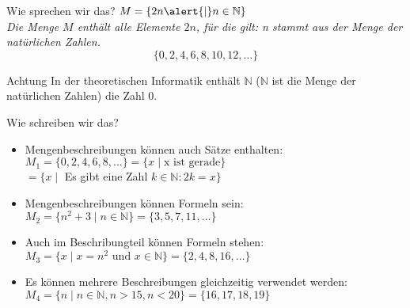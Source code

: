 %
%
%
%

\begin{frame}[fragile]{Wie sprechen wir das?}
$M = \{2n \alert{\mid} n \in \mathbb{N}\}$ \\

\emph{Die Menge $M$ enthält alle Elemente $2n$, \alert{für die gilt}: n stammt aus der Menge der natürlichen Zahlen.}
\vspace{5pt}
$$
\{0, 2, 4, 6, 8, 10, 12, \dots \}
$$

\begin{alertblock}{Achtung}
    In der theoretischen Informatik enthält $\mathbb{N}$ ($\mathbb{N}$ ist die Menge der natürlichen Zahlen) die Zahl 0.
\end{alertblock}

\end{frame}


\begin{frame}[fragile]{Wie schreiben wir das?}
    \begin{itemize}[<+- | alert@+>]
        \item Mengenbeschreibungen können auch Sätze enthalten:
        $M_1 = \{0,2,4,6,8,\dots\} = \{x \mid \text{x ist gerade}\}$\\
        \hspace{4.5mm}$= \{x \mid$ Es gibt eine Zahl $k \in \mathbb{N} : 2k = x\}$\\
        
        \item Mengenbeschreibungen können Formeln sein:
        $M_2 = \{n^2+3 \mid n \in \mathbb{N}\} = \{3, 5, 7, 11, \dots\}$
        
        \item Auch im Beschribungteil können Formeln stehen:
        $M_3 = \{x \mid x = n^2 \text{ und } x\in \mathbb{N}\} = \{2, 4, 8, 16, \dots\}$
        
        \item Es können mehrere Beschreibungen gleichzeitig verwendet werden:
        $M_4 = \{n \mid n \in \mathbb{N}, n > 15, n < 20\} = \{16, 17, 18, 19\}$\\
    
    \end{itemize}
\end{frame}

